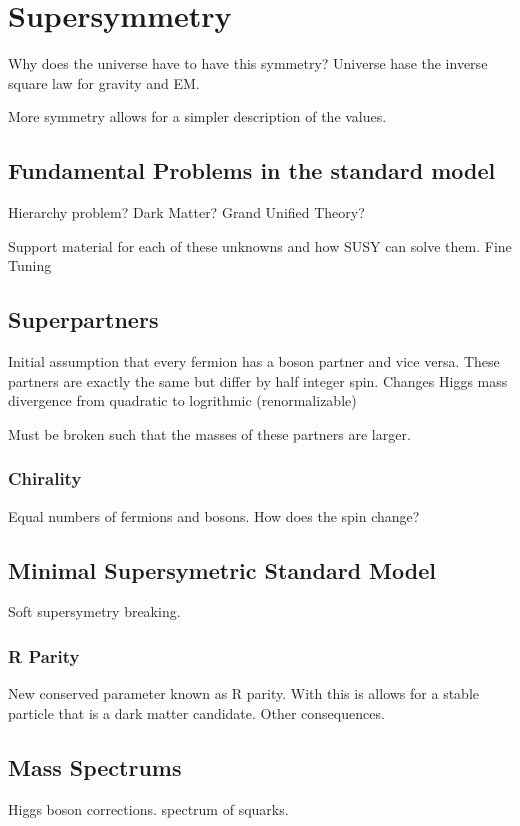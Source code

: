 \chapter{Supersymmetry}
\label{ch:SUSY}

Why does the universe have to have this symmetry?
Universe hase the inverse square law for gravity and EM.

More symmetry allows for a simpler description of the values. 

\section{Fundamental Problems in the standard model}
\label{sec:Hierarchy}

Hierarchy problem?
Dark Matter?
Grand Unified Theory?

Support material for each of these unknowns and how SUSY can solve them. Fine Tuning

\section{Superpartners}
\label{sec:superpartners}

Initial assumption that every fermion has a boson partner and vice versa. These partners are exactly the same but differ by half integer spin. Changes Higgs mass divergence from quadratic to logrithmic (renormalizable)

Must be broken such that the masses of these partners are larger.

\subsection{Chirality}
\label{subsec:chiral}

Equal numbers of fermions and bosons. How does the spin change? 

\section{Minimal Supersymetric Standard Model}
\label{sec:MSSM}

Soft supersymetry breaking. 

\subsection{R Parity}
\label{subsec:rparity}

New conserved parameter known as R parity. With this is allows for a stable particle that is a dark matter candidate. Other consequences.

\section{Mass Spectrums}

Higgs boson corrections. spectrum of squarks. 






